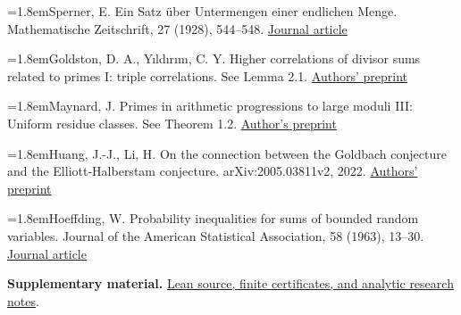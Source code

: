 \documentclass[11pt,a4paper]{article}
\begin{document}
\par\smallskip\noindent\hangindent=1.8em\makebox[1.8em][l]{[5]}Sperner, E. Ein Satz über Untermengen einer endlichen Menge. Mathematische Zeitschrift, 27 (1928), 544--548. \href{https://doi.org/10.1007/BF01171114}{Journal article}

\par\smallskip\noindent\hangindent=1.8em\makebox[1.8em][l]{[6]}Goldston, D. A., Yıldırım, C. Y. Higher correlations of divisor sums related to primes I: triple correlations. See Lemma 2.1. \href{https://arxiv.org/abs/math/0111212}{Authors' preprint}

\par\smallskip\noindent\hangindent=1.8em\makebox[1.8em][l]{[7]}Maynard, J. Primes in arithmetic progressions to large moduli III: Uniform residue classes. See Theorem 1.2. \href{https://arxiv.org/abs/2006.08250}{Author's preprint}

\par\smallskip\noindent\hangindent=1.8em\makebox[1.8em][l]{[8]}Huang, J.-J., Li, H. On the connection between the Goldbach conjecture and the Elliott-Halberstam conjecture. arXiv:2005.03811v2, 2022. \href{https://arxiv.org/abs/2005.03811v2}{Authors' preprint}

\par\smallskip\noindent\hangindent=1.8em\makebox[1.8em][l]{[9]}Hoeffding, W. Probability inequalities for sums of bounded random variables. Journal of the American Statistical Association, 58 (1963), 13--30. \href{https://doi.org/10.1080/01621459.1963.10500830}{Journal article}

\endgroup\medskip

\textbf{Supplementary material.} \href{https://github.com/ZhaoJiuxiao-expert/goldbach-endpoint-estimates/blob/main/lean-source.zip}{Lean source, finite certificates, and analytic research notes}.
\end{document}
